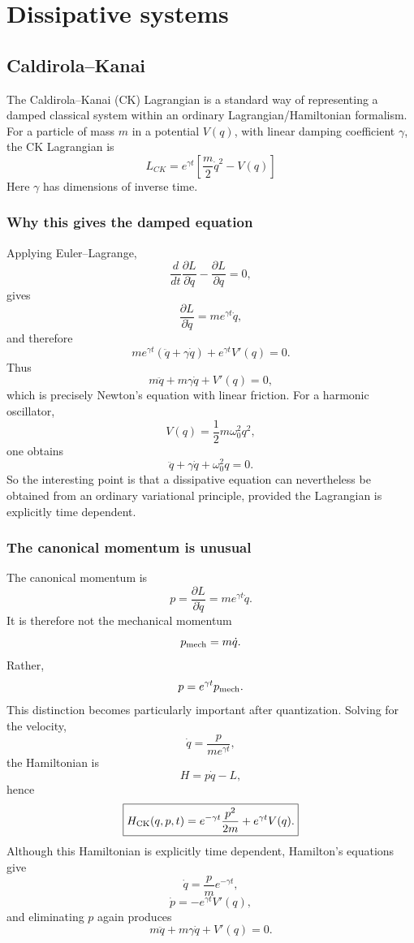 \chapter{Dissipative systems}
\section{Caldirola–Kanai}
The Caldirola–Kanai (CK) Lagrangian is a standard way of representing a damped classical system within an ordinary Lagrangian/Hamiltonian formalism.
For a particle of mass \(m\) in a potential \(V(q)\), with linear damping coefficient \(\gamma\), the CK Lagrangian is
\[L_{CK}=e^{\gamma t}\left [\frac{m}{2}\dot{q}^2-V(q)\right]\]
Here \(\gamma\) has dimensions of inverse time.

\subsection{ Why this gives the damped equation}
Applying Euler–Lagrange,
$$ \frac{d}{dt}\frac{\partial L}{\partial\dot q} -\frac{\partial L}{\partial q}=0, $$
gives
$$ \frac{\partial L}{\partial\dot q} =m e^{\gamma t}\dot q, $$
and therefore
$$ m e^{\gamma t}(\ddot q+\gamma\dot q) + e^{\gamma t}V'(q)=0. $$
Thus
$$ \boxed{ m\ddot q+m\gamma\dot q+V'(q)=0, } $$
which is precisely Newton's equation with linear friction.
For a harmonic oscillator,
$$ V(q)=\frac12m\omega_0^2q^2, $$
one obtains
$$ \boxed{ \ddot q+\gamma\dot q+\omega_0^2q=0. } $$
So the interesting point is that a dissipative equation can nevertheless be obtained from an ordinary variational principle, provided the Lagrangian is explicitly time dependent.
\subsection{The canonical momentum is unusual}
The canonical momentum is
$$ \boxed{ p=\frac{\partial L}{\partial\dot q} =m e^{\gamma t}\dot q. } $$
It is therefore not the mechanical momentum
$$ p_{\rm mech}=m\dot q. $$
Rather,
$$ p=e^{\gamma t}p_{\rm mech}. $$
This distinction becomes particularly important after quantization.
Solving for the velocity,
$$ \dot q=\frac{p}{m e^{\gamma t}}, $$
the Hamiltonian is
$$ H=p\dot q-L, $$
hence
$$ \boxed{ H_{\rm CK}(q,p,t) = e^{-\gamma t}\frac{p^2}{2m} + e^{\gamma t}V(q). } $$
Although this Hamiltonian is explicitly time dependent, Hamilton's equations give
$$ \dot q=\frac{p}{m}e^{-\gamma t}, $$ $$ \dot p=-e^{\gamma t}V'(q), $$
and eliminating \(p\) again produces
$$ m\ddot q+m\gamma\dot q+V'(q)=0. $$

